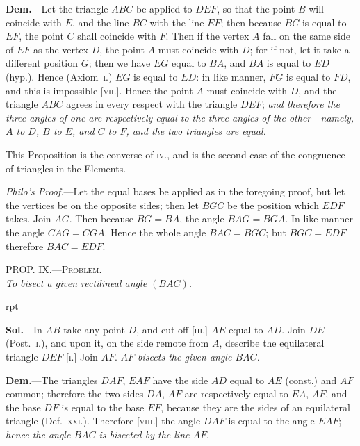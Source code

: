 \documentclass[oneside]{book}
\newcommand\myprop[2]{
\bigskip\Needspace*{4\baselineskip}\begin{center}\textsc{#1}\\\medskip\emph{#2}\par\end{center}
}
\newcommand\imgflow[3]{
\setcounter{wrapwidth}{#1}
\begin{wrapfigure}[#2]{r}{\value{wrapwidth}pt}
\begin{center}
\vspace{-0.3in}
\end{center}
\end{wrapfigure}
}
\newcommand\imgcent[2]{
\begin{center}
\end{center}
}
\begin{document}
\textbf{Dem.}---Let the triangle $ABC$ be applied to $DEF$,
so that the point $B$ will coincide with $E$, and the
line $BC$ with the line $EF$; then because $BC$ is equal
to $EF$, the point $C$ shall coincide with $F$. Then if the
vertex $A$ fall on the same side of $EF$ as the vertex $D$,
the point $A$ must coincide
with $D$; for if not,
let it take a different
position $G$; then we have
$EG$ equal to $BA$, and $BA$
is equal to $ED$ (hyp.).
Hence (Axiom~\textsc{i.}) $EG$ is
equal to $ED$: in like
manner, $FG$ is equal to $FD$, and this is impossible [\textsc{vii.}].
Hence the point $A$ must coincide with $D$, and the
triangle $ABC$ agrees in every respect with the triangle
$DEF$; \emph{and therefore the three angles of one are respectively
equal to the three angles of the other---namely, $A$ to
$D$, $B$ to $E$, and $C$ to $F$, and the two triangles are equal.}

This Proposition is the converse of \textsc{iv.}, and is the
second case of the congruence of triangles in the
Elements.

\imgcent{177}{f023}

\begin{footnotesize}
\emph{Philo's Proof.}---Let the equal bases be applied as in the foregoing
proof, but let the vertices be on the opposite sides; then let
$BGC$ be the position which $EDF$ takes. Join $AG$. Then because
$BG = BA$, the angle $BAG = BGA$. In like manner the angle $CAG
= CGA$. Hence the whole angle $BAC = BGC$; but $BGC = EDF$
therefore $BAC = EDF$.
\par\end{footnotesize}


\myprop{PROP\@. IX\@.---Problem.}{To bisect a given rectilineal angle $(BAC)$.}

\imgflow{120}{13}{f024}

\textbf{Sol.}---In $AB$ take any point $D$, and cut off [\textsc{iii.}] $AE$
equal to $AD$. Join $DE$ (Post.~\textsc{i.}),
and upon it, on the side remote
from $A$, describe the equilateral
triangle $DEF$ [\textsc{i.}] Join
$AF$. \emph{$AF$ bisects the given angle
$BAC$.}

\textbf{Dem.}---The triangles $DAF$,
$EAF$ have the side $AD$ equal
to $AE$ (const.) and $AF$ common;
therefore the two sides $DA$, $AF$
are respectively equal to $EA$,
$AF$, and the base $DF$ is equal to
the base $EF$, because they are the sides of an equilateral
triangle (Def.~\textsc{xxi.}). Therefore [\textsc{viii.}] the
angle $DAF$ is equal to the angle $EAF$; \emph{hence the angle
$BAC$ is bisected by the line $AF$}.
\end{document}
